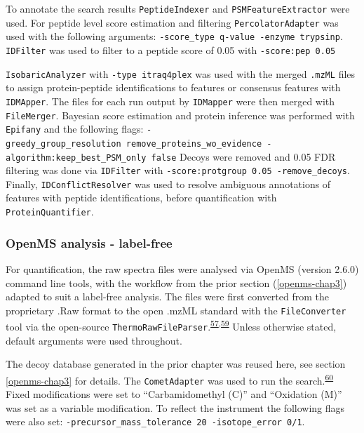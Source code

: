 \documentclass[
]{article}
\begin{document}
To annotate the search results \texttt{PeptideIndexer} and \texttt{PSMFeatureExtractor} were used.
For peptide level score estimation and filtering \texttt{PercolatorAdapter} was used with the following arguments: \texttt{-score\_type\ q-value\ -enzyme\ trypsinp}.
\texttt{IDFilter} was used to filter to a peptide score of 0.05 with \texttt{-score:pep\ 0.05}

\texttt{IsobaricAnalyzer} with \texttt{-type\ itraq4plex} was used with the merged \texttt{.mzML} files to assign protein-peptide identifications to features or consensus features with \texttt{IDMApper}.
The files for each run output by \texttt{IDMapper} were then merged with \texttt{FileMerger}.
Bayesian score estimation and protein inference was performed with \texttt{Epifany} and the following flags: \texttt{-greedy\_group\_resolution\ remove\_proteins\_wo\_evidence\ -algorithm:keep\_best\_PSM\_only\ false}
Decoys were removed and 0.05 FDR filtering was done via \texttt{IDFilter} with \texttt{-score:protgroup\ 0.05\ -remove\_decoys}.
Finally, \texttt{IDConflictResolver} was used to resolve ambiguous annotations of features with peptide identifications, before quantification with \texttt{ProteinQuantifier}.

\hypertarget{openms-label-free}{%
\subsubsection{OpenMS analysis - label-free}\label{openms-label-free}}

For quantification, the raw spectra files were analysed via OpenMS (version 2.6.0) command line tools, with the workflow from the prior section (\ref{openms-chap3}) adapted to suit a label-free analysis.
The files were first converted from the proprietary .Raw format to the open .mzML standard with the \texttt{FileConverter} tool via the open-source \texttt{ThermoRawFileParser}.\textsuperscript{\protect\hyperlink{ref-rost_openms_2016}{57},\protect\hyperlink{ref-hulstaert_thermorawfileparser_2020}{59}}
Unless otherwise stated, default arguments were used throughout.

The decoy database generated in the prior chapter was reused here, see section \ref{openms-chap3} for details.
The \texttt{CometAdapter} was used to run the search.\textsuperscript{\protect\hyperlink{ref-eng_comet_2013}{60}}
Fixed modifications were set to ``Carbamidomethyl (C)'' and ``Oxidation (M)'' was set as a variable modification.
To reflect the instrument the following flags were also set: \texttt{-precursor\_mass\_tolerance\ 20\ -isotope\_error\ 0/1}.
\end{document}
